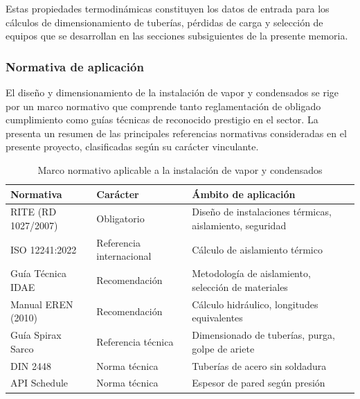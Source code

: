 Estas propiedades termodinámicas constituyen los datos de entrada para los cálculos de dimensionamiento de tuberías, pérdidas de carga y selección de equipos que se desarrollan en las secciones subsiguientes de la presente memoria.


\subsubsection{Normativa de aplicación}
\label{subsubsec:normativa-aplicacion}

El diseño y dimensionamiento de la instalación de vapor y condensados se rige por un marco normativo que comprende tanto reglamentación de obligado cumplimiento como guías técnicas de reconocido prestigio en el sector. La  presenta un resumen de las principales referencias normativas consideradas en el presente proyecto, clasificadas según su carácter vinculante.

\begin{table}[H]
	\centering
	\caption{Marco normativo aplicable a la instalación de vapor y condensados}
	\label{tab:normativa-aplicacion}
	\begin{tabular}{p{4.5cm}lp{5.5cm}}
		\toprule
		\textbf{Normativa}  & \textbf{Carácter}        & \textbf{Ámbito de aplicación}                            \\
		\midrule
		RITE (RD 1027/2007) & Obligatorio              & Diseño de instalaciones térmicas, aislamiento, seguridad \\
		ISO 12241:2022      & Referencia internacional & Cálculo de aislamiento térmico                           \\
		Guía Técnica IDAE   & Recomendación            & Metodología de aislamiento, selección de materiales      \\
		Manual EREN (2010)  & Recomendación            & Cálculo hidráulico, longitudes equivalentes              \\
		Guía Spirax Sarco   & Referencia técnica       & Dimensionado de tuberías, purga, golpe de ariete         \\
		DIN 2448            & Norma técnica            & Tuberías de acero sin soldadura                          \\
		API Schedule        & Norma técnica            & Espesor de pared según presión                           \\
		\bottomrule
	\end{tabular}
\end{table}

